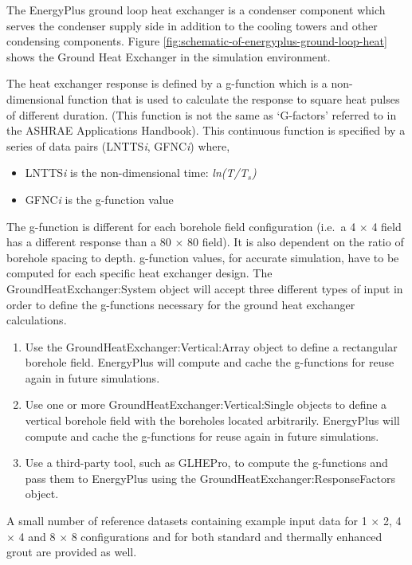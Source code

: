 The EnergyPlus ground loop heat exchanger is a condenser component which serves the condenser supply side in addition to the cooling towers and other condensing components. Figure \ref{fig:schematic-of-energyplus-ground-loop-heat} shows the Ground Heat Exchanger in the simulation environment.

The heat exchanger response is defined by a g-function which is a non-dimensional function that is used to calculate the response to square heat pulses of different duration. (This function is not the same as `G-factors' referred to in the ASHRAE Applications Handbook). This continuous function is specified by a series of data pairs (LNTTS\emph{i}, GFNC\emph{i}) where,

\begin{itemize}
\item
  LNTTS\emph{i} is the non-dimensional time: \emph{ln(T/T\(_{s}\))}
\item
  GFNC\emph{i} is the g-function value
\end{itemize}

The g-function is different for each borehole field configuration (i.e.~a 4 $\times$ 4 field has a different response than a 80 $\times$ 80 field). It is also dependent on the ratio of borehole spacing to depth. g-function values, for accurate simulation, have to be computed for each specific heat exchanger design. The GroundHeatExchanger:System object will accept three different types of input in order to define the g-functions necessary for the ground heat exchanger calculations.

\begin{enumerate}
    \item Use the GroundHeatExchanger:Vertical:Array object to define a rectangular borehole field. EnergyPlus will compute and cache the g-functions for reuse again in future simulations.
    \item Use one or more GroundHeatExchanger:Vertical:Single objects to define a vertical borehole field with the boreholes located arbitrarily. EnergyPlus will compute and cache the g-functions for reuse again in future simulations.
    \item Use a third-party tool, such as GLHEPro, to compute the g-functions and pass them to EnergyPlus using the GroundHeatExchanger:ResponseFactors object.
\end{enumerate}

A small number of reference datasets containing example input data for 1 $\times$ 2, 4 $\times$ 4 and 8 $\times$ 8 configurations and for both standard and thermally enhanced grout are provided as well.

